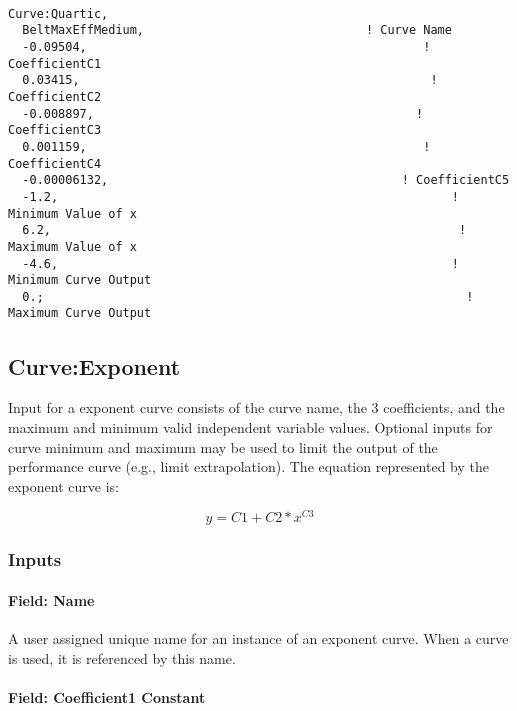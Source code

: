 \begin{lstlisting}

Curve:Quartic,
  BeltMaxEffMedium,                               ! Curve Name
  -0.09504,                                               ! CoefficientC1
  0.03415,                                                 ! CoefficientC2
  -0.008897,                                             ! CoefficientC3
  0.001159,                                               ! CoefficientC4
  -0.00006132,                                         ! CoefficientC5
  -1.2,                                                       ! Minimum Value of x
  6.2,                                                         ! Maximum Value of x
  -4.6,                                                       ! Minimum Curve Output
  0.;                                                           ! Maximum Curve Output
\end{lstlisting}

\subsection{Curve:Exponent}\label{curveexponent}

Input for a exponent curve consists of the curve name, the 3 coefficients, and the maximum and minimum valid independent variable values. Optional inputs for curve minimum and maximum may be used to limit the output of the performance curve (e.g., limit extrapolation). The equation represented by the exponent curve is:

\begin{equation}
y = C1 + C2*{x^{C3}}
\end{equation}

\subsubsection{Inputs}\label{inputs-5-019}

\paragraph{Field: Name}\label{field-name-5-015}

A user assigned unique name for an instance of an exponent curve. When a curve is used, it is referenced by this name.

\paragraph{Field: Coefficient1 Constant}\label{field-coefficient1-constant-5}

